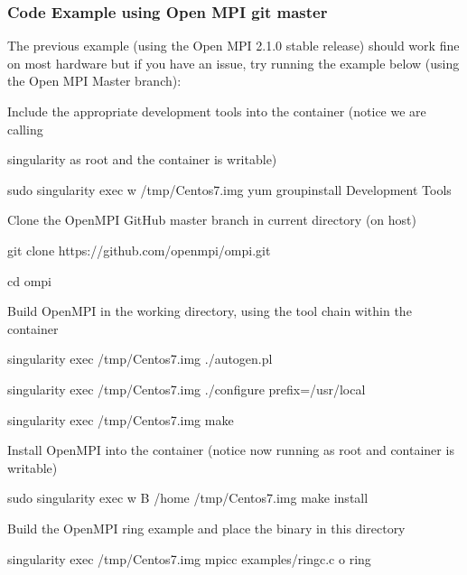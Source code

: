 \documentclass[letterpaper,10pt,english]{sphinxmanual}
\begin{document}
\subsubsection{Code Example using Open MPI git master}
\label{\detokenize{installation_environments:code-example-using-open-mpi-git-master}}
The previous example (using the Open MPI 2.1.0 stable release) should
work fine on most hardware but if you have an issue, try running the
example below (using the Open MPI Master branch):

%
\begin{sphinxVerbatim}[commandchars=\\\{\}]
\PYGZdl{} \PYGZsh{} Include the appropriate development tools into the container (notice we are calling

\PYGZdl{} \PYGZsh{} singularity as root and the container is writable)

\PYGZdl{} sudo singularity exec \PYGZhy{}w /tmp/Centos\PYGZhy{}7.img yum groupinstall \PYGZdq{}Development Tools\PYGZdq{}

\PYGZdl{}

\PYGZdl{} \PYGZsh{} Clone the OpenMPI GitHub master branch in current directory (on host)

\PYGZdl{} git clone https://github.com/open\PYGZhy{}mpi/ompi.git

\PYGZdl{} cd ompi

\PYGZdl{}

\PYGZdl{} \PYGZsh{} Build OpenMPI in the working directory, using the tool chain within the container

\PYGZdl{} singularity exec /tmp/Centos\PYGZhy{}7.img ./autogen.pl

\PYGZdl{} singularity exec /tmp/Centos\PYGZhy{}7.img ./configure \PYGZhy{}\PYGZhy{}prefix=/usr/local

\PYGZdl{} singularity exec /tmp/Centos\PYGZhy{}7.img make

\PYGZdl{}

\PYGZdl{} \PYGZsh{} Install OpenMPI into the container (notice now running as root and container is writable)

\PYGZdl{} sudo singularity exec \PYGZhy{}w \PYGZhy{}B /home /tmp/Centos\PYGZhy{}7.img make install

\PYGZdl{}

\PYGZdl{} \PYGZsh{} Build the OpenMPI ring example and place the binary in this directory

\PYGZdl{} singularity exec /tmp/Centos\PYGZhy{}7.img mpicc examples/ring\PYGZus{}c.c \PYGZhy{}o ring


\end{sphinxVerbatim}
\end{document}

